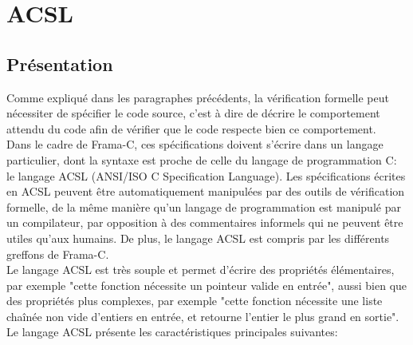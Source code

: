 \newpage


\section{ACSL}\label{ACSL}

\subsection{Présentation}
Comme expliqué dans les paragraphes précédents, la vérification formelle peut nécessiter de spécifier le code source, c'est à dire de décrire le comportement attendu du code afin de vérifier que le code respecte bien ce comportement.
\\
\noindent
Dans le cadre de Frama-C, ces spécifications doivent s'écrire dans un langage particulier, dont la syntaxe est proche de celle du langage de programmation C: le langage ACSL (ANSI/ISO C Specification Language).
\newline
\noindent Les spécifications écrites en ACSL peuvent être automatiquement manipulées par des outils de vérification formelle, de la même manière qu'un langage de programmation est manipulé par un compilateur, par opposition à des commentaires informels qui ne peuvent être utiles qu'aux humains. De plus, le langage ACSL est compris par les différents greffons de Frama-C.
\\
\noindent
Le langage ACSL est très souple et permet d'écrire des propriétés élémentaires, par exemple "cette fonction nécessite un pointeur valide en entrée", aussi bien que des propriétés plus complexes, par exemple "cette fonction nécessite une liste chaînée non vide d'entiers en entrée, et retourne l'entier le plus grand en sortie".
\\
\noindent
Le langage ACSL présente les caractéristiques principales suivantes:
